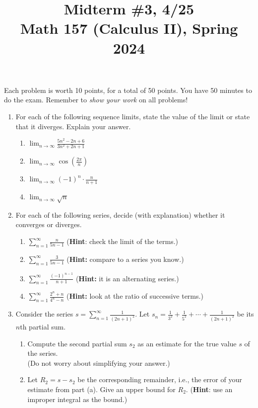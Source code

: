 \documentclass[11pt]{article}
\title{Midterm \#3, 4/25 \\ Math 157 (Calculus II), Spring 2024}
\date{}
\begin{document}
\maketitle

\thispagestyle{empty}

\vspace{-2cm}

Each problem is worth 10 points, for a total of 50 points. You have 50 minutes to do the exam. Remember to \emph{show your work} on all problems!

\begin{enumerate}

\item For each of the following sequence limits, state the value of the limit or state that it diverges. Explain your answer.
\begin{enumerate}
\item $\displaystyle \lim_{n\to \infty} \frac{5n^2-2n+6}{3n^2+2n+1}$
\item $\displaystyle \lim_{n\to \infty} \cos(\frac{2\pi}{n})$
\item $\displaystyle \lim_{n\to \infty} (-1)^n \cdot \frac{n}{n+1}$
\item $\displaystyle \lim_{n\to \infty} \sqrt{n}$
\end{enumerate}

\item For each of the following series, decide (with explanation) whether it converges or diverges.
\begin{enumerate}
\item $\displaystyle \sum_{n=1}^{\infty} \frac{n}{5n-1}$ \hfill ({\bf Hint}: check the limit of the terms.)
\item $\displaystyle \sum_{n=1}^{\infty} \frac{3}{5n-1}$ \hfill ({\bf Hint:} compare to a series you know.)
\item $\displaystyle \sum_{n=1}^{\infty} \frac{(-1)^{n-1}}{n+1}$ \hfill ({\bf Hint:} it is an alternating series.)
\item $\displaystyle \sum_{n=1}^{\infty} \frac{2^n+n}{4^n-n}$ \hfill ({\bf Hint:} look at the ratio of successive terms.)
\end{enumerate}

\item Consider the series $s=\displaystyle \sum_{n=1}^{\infty} \frac{1}{(2n+1)^2}$. Let $s_n = \frac{1}{3^2} + \frac{1}{5^2} + \cdots + \frac{1}{(2n+1)^2}$ be its $n$th partial sum.
\begin{enumerate}
\item Compute the second partial sum $s_2$ as an estimate for the true value $s$ of the series. \\ (Do not worry about simplifying your answer.)
\item Let $R_2 = s - s_2$ be the corresponding remainder, i.e., the error of your estimate from part (a). Give an upper bound for $R_2$. ({\bf Hint}: use an improper integral as the bound.)
\end{enumerate}


\end{enumerate}
\end{document}

